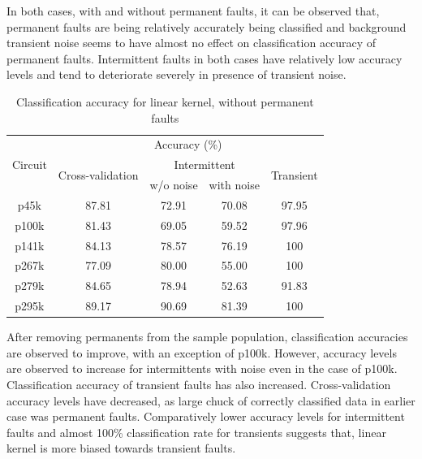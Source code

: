 In both cases, with and without permanent faults, it can be observed that, permanent faults are being relatively accurately being classified and background transient noise seems to have almost no effect on classification accuracy of permanent faults. Intermittent faults in both cases have relatively low accuracy levels and tend to deteriorate severely in presence of transient noise. 


\begin{table}[h]
\captionsetup{justification=centering}
\begin{tabular}{ccccc}
\hline
\multirow{3}{*}{Circuit} & \multicolumn{4}{c}{Accuracy (\%)}\\ \cline{2-5} 
                         & \multirow{2}{*}{Cross-validation} & \multicolumn{2}{c}{Intermittent} & \multirow{2}{*}{Transient} \\ \cline{3-4}
                         &                                   & w/o noise      & with noise      &                            \\ \hline
p45k                     & 87.81                             & 72.91          & 70.08           & 97.95                      \\
p100k                    & 81.43                             & 69.05          & 59.52           & 97.96                      \\
p141k                    & 84.13                             & 78.57          & 76.19           & 100                        \\
p267k                    & 77.09                             & 80.00          & 55.00           & 100                        \\
p279k                    & 84.65                             & 78.94          & 52.63           & 91.83                      \\
p295k                    & 89.17                             & 90.69          & 81.39           & 100           \\
\hline            
\end{tabular}
\caption {Classification accuracy for linear kernel, without permanent faults}
\label{tab:linwop}
\end{table}

After removing permanents from the sample population, classification accuracies are observed to improve, with an exception of p100k. However, accuracy levels are observed to increase for intermittents with noise even in the case of p100k. Classification accuracy of transient faults has also increased. Cross-validation accuracy levels have decreased, as large chuck of correctly classified data in earlier case was permanent faults. Comparatively lower accuracy levels for intermittent faults and almost 100\% classification rate for transients suggests that, linear kernel is more biased towards transient faults.

